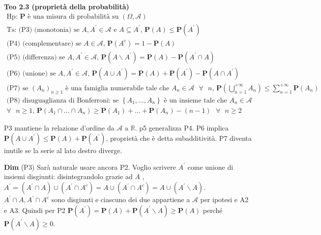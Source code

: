 \documentclass{article}
\begin{document}
\textbf{Teo 2.3 (propriet\`{a} della probabilit\`{a})}%
\begin{gather*}
\text{Hp: }\mathbf{P}\text{ \`{e} una misura di probabilit\`{a} su }\left(
\Omega ,\mathcal{A}\right) \\
\text{Ts: (P3) (monotonia) se }A,A^{\prime }\in \mathcal{A}\text{ e }%
A\subseteq A^{\prime }\text{, }\mathbf{P}\left( A\right) \leq \mathbf{P}%
\left( A^{\prime }\right) \\
\text{(P4) (complementare) se }A\in \mathcal{A}\text{, }\mathbf{P}\left(
A^{c}\right) =1-\mathbf{P}\left( A\right) \\
\text{(P5) (differenza) se }A,A^{\prime }\in \mathcal{A}\text{, }\mathbf{P}%
\left( A\backslash A^{\prime }\right) =\mathbf{P}\left( A\right) -\mathbf{P}%
\left( A^{\prime }\cap A\right) \\
\text{(P6) (unione) se }A,A^{\prime }\in \mathcal{A}\text{, }\mathbf{P}%
\left( A\cup A^{\prime }\right) =\mathbf{P}\left( A\right) +\mathbf{P}\left(
A^{\prime }\right) -\mathbf{P}\left( A\cap A^{\prime }\right) \\
\text{(P7) se }\left( A_{n}\right) _{n\geq 1}\text{ \`{e} una famiglia
numerabile tale che }A_{n}\in \mathcal{A}\text{ }\forall \text{ }n\text{, }%
\mathbf{P}\left( \bigcup_{n=1}^{+\infty }A_{n}\right) \leq
\sum_{n=1}^{+\infty }\mathbf{P}\left( A_{n}\right) \\
\text{(P8) disuguaglianza di Bonferroni: se }\left\{ A_{1},...,A_{n}\right\} 
\text{ \`{e} un insieme tale che }A_{n}\in \mathcal{A}\text{ } \\
\forall \text{ }n\geq 1\text{, }\mathbf{P}\left( A_{1}\cap ...\cap
A_{n}\right) \geq \mathbf{P}\left( A_{1}\right) +...+\mathbf{P}\left(
A_{n}\right) -\left( n-1\right) \text{ }\forall \text{ }n\geq 2
\end{gather*}

P3 mantiene la relazione d'ordine da $\mathcal{A}$ a $%
\mathbb{R}
$. p5 generalizza P4. P6 implica $\mathbf{P}\left( A\cup A^{\prime }\right)
\leq \mathbf{P}\left( A\right) +\mathbf{P}\left( A^{\prime }\right) $,
propriet\`{a} che \`{e} detta subadditivit\`{a}. P7 diventa inutile se la
serie al lato destro diverge.

\textbf{Dim} (P3) Sar\`{a} naturale usare ancora P2. Voglio scrivere $%
A^{\prime }$ come unione di insiemi disgiunti: disintegrandolo grazie ad $A$%
, $A^{\prime }=\left( A^{\prime }\cap A\right) \cup \left( A^{\prime }\cap
A^{c}\right) =A\cup \left( A^{\prime }\cap A^{c}\right) =A\cup \left(
A^{\prime }\backslash A\right) $. $A^{\prime }\cap A,A^{\prime }\cap A^{c}$
sono disgiunti e ciascuno dei due appartiene a $\mathcal{A}$ per ipotesi e
A2 e A3. Quindi per P2 $\mathbf{P}\left( A^{\prime }\right) =\mathbf{P}%
\left( A\right) +\mathbf{P}\left( A^{\prime }\backslash A\right) \geq 
\mathbf{P}\left( A\right) $ perch\'{e} $\mathbf{P}\left( A^{\prime
}\backslash A\right) \geq 0$.
\end{document}
